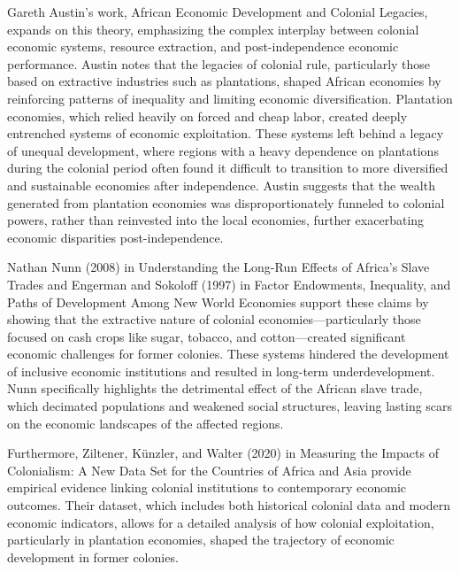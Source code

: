 \documentclass[12pt]{article}
\begin{document}
\vspace{0.2in}
\noindent Gareth Austin's work, African Economic Development and Colonial Legacies, expands on this theory, emphasizing the complex interplay between colonial economic systems, resource extraction, and post-independence economic performance. Austin notes that the legacies of colonial rule, particularly those based on extractive industries such as plantations, shaped African economies by reinforcing patterns of inequality and limiting economic diversification. Plantation economies, which relied heavily on forced and cheap labor, created deeply entrenched systems of economic exploitation. These systems left behind a legacy of unequal development, where regions with a heavy dependence on plantations during the colonial period often found it difficult to transition to more diversified and sustainable economies after independence. Austin suggests that the wealth generated from plantation economies was disproportionately funneled to colonial powers, rather than reinvested into the local economies, further exacerbating economic disparities post-independence.

\vspace{0.2in}
\noindent Nathan Nunn (2008) in Understanding the Long-Run Effects of Africa’s Slave Trades and Engerman and Sokoloff (1997) in Factor Endowments, Inequality, and Paths of Development Among New World Economies support these claims by showing that the extractive nature of colonial economies—particularly those focused on cash crops like sugar, tobacco, and cotton—created significant economic challenges for former colonies. These systems hindered the development of inclusive economic institutions and resulted in long-term underdevelopment. Nunn specifically highlights the detrimental effect of the African slave trade, which decimated populations and weakened social structures, leaving lasting scars on the economic landscapes of the affected regions.

\vspace{0.2in}
\noindent Furthermore, Ziltener, Künzler, and Walter (2020) in Measuring the Impacts of Colonialism: A New Data Set for the Countries of Africa and Asia provide empirical evidence linking colonial institutions to contemporary economic outcomes. Their dataset, which includes both historical colonial data and modern economic indicators, allows for a detailed analysis of how colonial exploitation, particularly in plantation economies, shaped the trajectory of economic development in former colonies.
\end{document}
